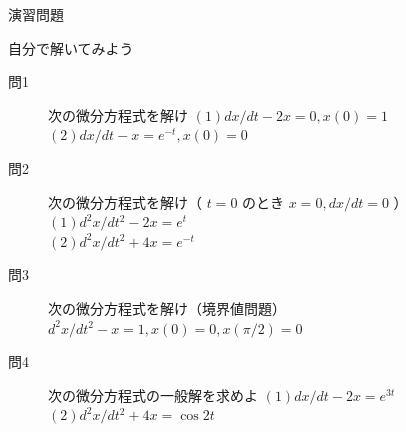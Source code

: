\documentclass[professionalfonts]{beamer}
\begin{document}
\begin{frame}{演習問題}
  \begin{exampleblock}{自分で解いてみよう}
  \begin{description}
    \item[問1] 次の微分方程式を解け
    $(1) dx/dt - 2x = 0,  x(0) = 1$\\
    $(2) dx/dt - x = e^{-t},  x(0) = 0$\\
    \item[問2] 次の微分方程式を解け（ $t = 0$ のとき $x = 0, dx/dt = 0$ ）
    $(1) d^{2}x/dt^{2} - 2x = e^t$\\
    $(2) d^{2}x/dt^{2} + 4x = e^{-t}$\\
    \item[問3] 次の微分方程式を解け（境界値問題）
    $d^{2}x/dt^{2} - x = 1,  x(0) = 0,  x(\pi/2) = 0$\\
    \item[問4] 次の微分方程式の一般解を求めよ
    $(1) dx/dt - 2x = e^{3t}$\\
    $(2) d^{2}x/dt^{2} + 4x = \cos 2t$\\
  \end{description}
  \end{exampleblock}
\end{frame}
\end{document}
